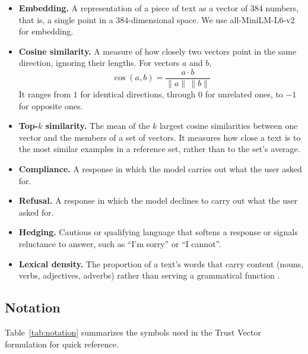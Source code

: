 \documentclass[conference]{IEEEtran}
\begin{document}
\begin{itemize}
    \item \textbf{Embedding.} A representation of a piece of text as a vector of $384$ numbers, that is, a single point in a $384$-dimensional space. We use all-MiniLM-L6-v2 \cite{ref40} for embedding.
    
    \item \textbf{Cosine similarity.} A measure of how closely two vectors point in the same direction, ignoring their lengths. For vectors $a$ and $b$,
    \begin{equation}
    \cos(a, b) = \frac{a \cdot b}{\|a\|\,\|b\|}
    \label{eq:cosine}
    \end{equation}
    It ranges from $1$ for identical directions, through $0$ for unrelated ones, to $-1$ for opposite ones. 
    
    \item \textbf{Top-$k$ similarity.} The mean of the $k$ largest cosine similarities between one vector and the members of a set of vectors. It measures how close a text is to the most similar examples in a reference set, rather than to the set's average.
    
    \item \textbf{Compliance.} A response in which the model carries out what the user asked for.
    
    \item \textbf{Refusal.} A response in which the model declines to carry out what the user asked for.
    
    \item \textbf{Hedging.} Cautious or qualifying language that softens a response or signals reluctance to answer, such as ``I'm sorry'' or ``I cannot''.
    
    \item \textbf{Lexical density.} The proportion of a text's words that carry content (nouns, verbs, adjectives, adverbs) rather than serving a grammatical function \cite{ref41}.
\end{itemize}

\subsection{Notation}

Table~\ref{tab:notation} summarizes the symbols used in the Trust Vector formulation for quick reference.
\end{document}
